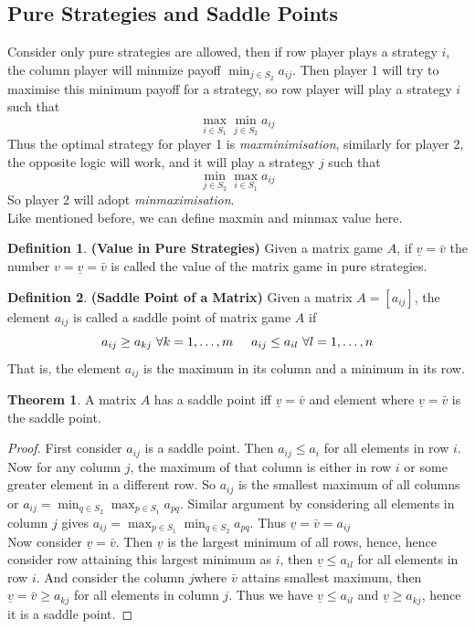 \documentclass{article}
\theoremstyle{definition}
\newtheorem{theorem}{Theorem}[section]
\newtheorem{defn}{Definition}[section]
\begin{document}
\subsection{Pure Strategies and Saddle Points}
Consider only pure strategies are allowed, then if row player plays a strategy $i$, the column player will minmize payoff $\min_{j\in S_2} a_{ij}$. Then player 1 will try to maximise this minimum payoff for a strategy, so row player will play a strategy $i$ such that $$\max_{i\in S_1} \min_{j\in S_2} a_{ij}$$ Thus the optimal strategy for player 1 is \textit{maxminimisation}, similarly for player 2, the opposite logic will work, and it will play a strategy $j$ such that $$\min_{j\in S_2}\max_{i\in S_1} a_{ij}$$ So player 2 will adopt \textit{minmaximisation}.\\
Like mentioned before, we can define maxmin and minmax value here. 
\begin{defn}
\textbf{(Value in Pure Strategies)} Given a matrix game $A$, if $\underline{v} = \bar{v}$ the number $v = \underline{v} = \bar{v}$ is called the value of the matrix game in pure strategies.
\end{defn}
\begin{defn}
\textbf{(Saddle Point of a Matrix)} Given a matrix $A = [a_{ij}]$, the element $a_{ij}$ is called a saddle point of matrix game $A$ if $$a_{ij}\geq a_{kj} ~\forall k = 1,\dots,m \hspace{5mm} a_{ij}\leq a_{il} ~\forall l = 1,\dots,n$$
That is, the element $a_{ij}$ is the maximum in its column and a minimum in its row.
\end{defn}
\begin{theorem}
\label{saddle}
A matrix $A$ has a saddle point iff $\underline{v} = \bar{v}$ and element where $\underline{v} = \bar{v}$ is the saddle point.
\end{theorem}
\begin{proof}
First consider $a_{ij}$ is a saddle point. Then $a_{ij}\leq a_i$ for all elements in row $i$. Now for any column $j$, the maximum of that column is either in row $i$ or some greater element in a different row. So $a_{ij}$ is the smallest maximum of all columns or $a_{ij} = \min_{q\in S_2}\max_{p\in S_1} a_{pq}$. Similar argument by considering all elements in column $j$ gives $a_{ij} = \max_{p\in S_1}\min_{q\in S_2} a_{pq}$. Thus $\underline{v} = \bar{v} = a_{ij}$\\

Now consider $\underline{v} = \bar{v}$. Then $\underline{v}$ is the largest minimum of all rows, hence, hence consider row attaining this largest minimum as $i$, then $\underline{v}\leq a_{il}$ for all elements in row $i$. And consider the column $j$where $\bar{v}$ attains smallest maximum, then $\underline{v} = \bar{v}\geq a_{kj}$ for all elements in column $j$. Thus we have $\underline{v}\leq a_{il}$ and $\underline{v}\geq a_{kj}$, hence it is a saddle point.
\end{proof}
\end{document}
